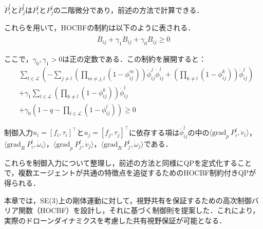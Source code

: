 $\ddot{P}_i^l$と$\ddot{P}_j^l$は$P_i^l$と$P_j^l$の二階微分であり，前述の方法で計算できる．

これらを用いて，HOCBFの制約は以下のように表される．
\begin{equation}
\begin{aligned}
\ddot{B}_{ij} + \gamma_1 \dot{B}_{ij} + \gamma_0 B_{ij} \geq 0
\label{eq:hocbf_constraint_edge}
\end{aligned}
\end{equation}

ここで，$\gamma_0, \gamma_1 > 0$は正の定数である．この制約を展開すると：
\begin{equation}
\begin{aligned}
&\sum_{l \in \mathcal{L}} \left( -\sum_{j \neq l} \left( \prod_{m \neq j, l} (1 - \phi_{ij}^m) \right) \dot{\phi}_{ij}^j \dot{\phi}^l_{ij} + \left( \prod_{k \neq l} (1 - \phi_{ij}^k) \right) \ddot{\phi}^l_{ij} \right) \\
&+ \gamma_1 \sum_{l \in \mathcal{L}} \left( \prod_{k \neq l} (1 - \phi_{ij}^k) \right) \dot{\phi}^l_{ij} \\
&+ \gamma_0 (1 - q - \prod_{l \in \mathcal{L}} (1 - \phi_{ij}^l)) \geq 0
\label{eq:hocbf_constraint_edge_expanded}
\end{aligned}
\end{equation}

制御入力$u_i = [f_i, \tau_i]^\top$と$u_j = [f_j, \tau_j]^\top$に依存する項は$\ddot{\phi}^l_{ij}$の中の$\langle \mathrm{grad}_p\:P_i^l, \dot{v}_i \rangle$，$\langle \mathrm{grad}_R\:P_i^l, \dot{\omega}_i \rangle$，$\langle \mathrm{grad}_p\:P_j^l, \dot{v}_j \rangle$，$\langle \mathrm{grad}_R\:P_j^l, \dot{\omega}_j \rangle$である．

これらを制御入力について整理し，前述の方法と同様にQPを定式化することで，複数エージェントが共通の特徴点を追従するためのHOCBF制約付きQPが得られる．

本章では，SE(3)上の剛体運動に対して，視野共有を保証するための高次制御バリア関数（HOCBF）を設計し，それに基づく制御則を提案した．これにより，実際のドローンダイナミクスを考慮した共有視野保証が可能となる．
